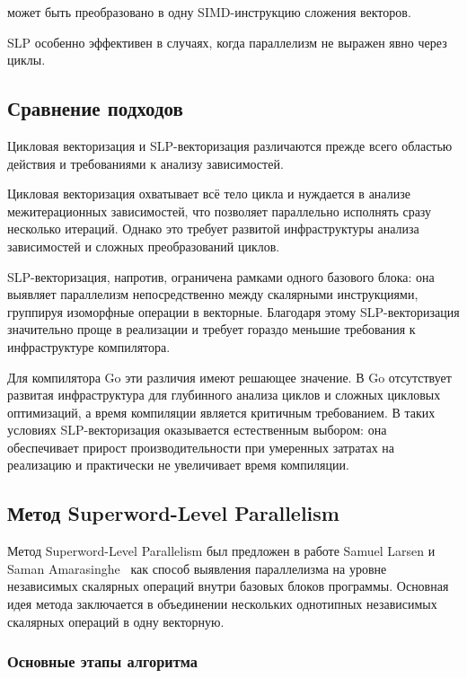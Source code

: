 может быть преобразовано в одну SIMD-инструкцию сложения векторов.

SLP особенно эффективен в случаях, когда параллелизм не выражен явно через циклы.


\subsection{Сравнение подходов}

Цикловая векторизация и SLP-векторизация различаются прежде всего областью действия и требованиями к анализу зависимостей.

Цикловая векторизация охватывает всё тело цикла и нуждается в анализе межитерационных зависимостей, 
что позволяет параллельно исполнять сразу несколько итераций.
Однако это требует развитой инфраструктуры анализа зависимостей и сложных преобразований циклов.

SLP-векторизация, напротив, ограничена рамками одного базового блока:
она выявляет параллелизм непосредственно между скалярными инструкциями, группируя изоморфные операции в векторные.
Благодаря этому SLP-векторизация значительно проще в реализации и требует гораздо меньшие требования к инфраструктуре компилятора.

Для компилятора Go эти различия имеют решающее значение.
В Go отсутствует развитая инфраструктура для глубинного анализа циклов и сложных цикловых оптимизаций, 
а время компиляции является критичным требованием.
В таких условиях SLP-векторизация оказывается естественным выбором: она обеспечивает прирост производительности 
при умеренных затратах на реализацию и практически не увеличивает время компиляции.

\subsection{Метод Superword-Level Parallelism}

Метод Superword-Level Parallelism был предложен в работе Samuel Larsen и Saman Amarasinghe~\cite{Larsen2000} 
как способ выявления параллелизма на уровне независимых скалярных операций внутри базовых блоков программы. 
Основная идея метода заключается в объединении нескольких однотипных независимых скалярных операций в одну векторную.

\subsubsection{Основные этапы алгоритма}

